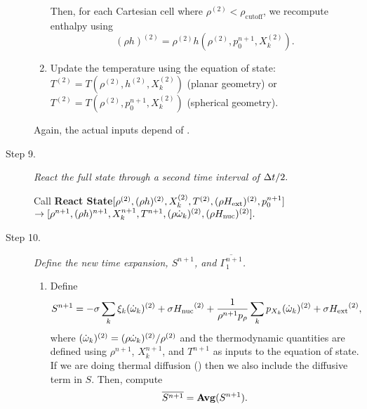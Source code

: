 \begin{description}
\begin{enumerate}
\begin{enumerate}
\end{enumerate}

Then, for each Cartesian cell where $\rho^{(2)} < \rho_\mathrm{cutoff}$, we recompute enthalpy using
\begin{equation}
(\rho h)^{(2)} = \rho^{(2)}h\left(\rho^{(2)},p_0^{n+1},X_k^{(2)}\right).
\end{equation}

\item Update the temperature using the equation of state:
$T^{(2)} = 
   T(\rho^{(2)}, h^{(2)}, X_k^{(2)})$ (planar geometry) or
$T^{(2)} = 
   T(\rho^{(2)}, p_0^{n+1}, X_k^{(2)})$ (spherical geometry).
\end{enumerate}
Again, the actual inputs depend of .

\item[Step 9.] {\em React the full state through a second time interval of $\Delta t / 2.$}

Call {\bf React State}$[\rho^{(2)},(\rho h)^{(2)}, X_k^{(2)},T^{(2)}, (\rho{H_{\rm ext}})^{(2)}, p_0^{n+1}]$\\
\phantom{ }\hfill$\rightarrow [\rho^{n+1}, (\rho h)^{n+1}, X_k^{n+1}, T^{n+1}, (\rho \dot{\omega}_k)^{(2)}, (\rho {H_{\rm nuc}})^{(2)} ].$  

\item[Step 10.] {\em Define the new time expansion, $S^{n+1}$, and $\overline{\Gamma_1^{n+1}}$.}

\begin{enumerate}
\renewcommand{\theenumi}{{\bf \Alph{enumi}}}
\item Define
\begin{equation}
  S^{n+1} =  -\sigma  \sum_k  \xi_k (\dot{\omega}_k)^{(2)}  + \sigma {H_{\rm nuc}}^{(2)} +
  \frac{1}{\rho^{n+1} p_\rho} \sum_k p_{X_k}  ({\dot{\omega}}_k)^{(2)}  
   + \sigma {H_{\rm ext}}^{(2)},
\end{equation}
where $(\dot{\omega}_k)^{(2)} = (\rho \dot{\omega}_k)^{(2)} / \rho^{(2)}$
and the thermodynamic quantities are defined using $\rho^{n+1}$,
$X_k^{n+1}$, and $T^{n+1}$ as inputs to the equation of state.
If we are doing thermal diffusion ()
then we also include the diffusive term in $S$.
Then, compute
\begin{equation}
\overline{S^{n+1}} = {\mathrm{\bf Avg}} (S^{n+1}).
\end{equation}


\end{enumerate}
\end{description}
